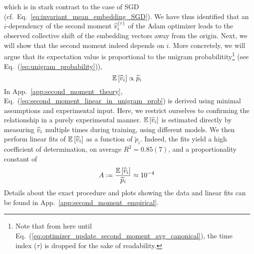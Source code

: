 which is in stark contrast to the case of SGD (cf.~Eq.~\eqref{eq:invariant_mean_embedding_SGD}).
We have thus identified that an $i$-dependency of the second moment $\widehat{v}_i^{(\tau)}$ of the Adam optimizer leads to the observed collective shift of the embedding vectors away from the origin.
Next, we will show that the second moment indeed depends on $i$. More concretely, we will argue that its expectation value is proportional to the unigram probabilitity\footnote{Note that from here until Eq.~(\ref{eq:optimizer_update_second_moment_avg_canonical}), the time index ($\tau$) is dropped for the sake of readability.} (see Eq.~(\ref{eq:unigram_probability})),
\begin{equation}
    \mathbb{E} \left[ \widehat{v}_i \right] \propto \widetilde p_i 
    \label{eq:second_moment_linear_in_unigram_prob}
\end{equation}
In App.~\ref{app:second_moment_theory}, Eq.~(\ref{eq:second_moment_linear_in_unigram_prob}) is derived using minimal assumptions and experimental input.
Here, we restrict ourselves to confirming the relationship in a purely experimental manner. 
$\mathbb{E} \left[ \widehat{v}_i \right]$ is estimated directly by measuring $\widehat{v}_i$ multiple times during training, using different models. 
We then perform linear fits of $\mathbb{E} \left[ \widehat{v}_i \right]$ as a function of $\widetilde p_i$. 
Indeed, the fits yield a high coefficient of determination, on average $R^2 = 0.85(7)$, and a proportionality constant of 
\begin{equation}
A := \frac{\mathbb{E} \left[ \widehat{v}_i \right]}{\widetilde p_i} \approx 10^{-4}
\label{eq:second_moment_proportionality_constant}
\end{equation}
Details about the exact procedure and plots showing the data and linear fits can be found in App.~\ref{app:second_moment_empirical}.
